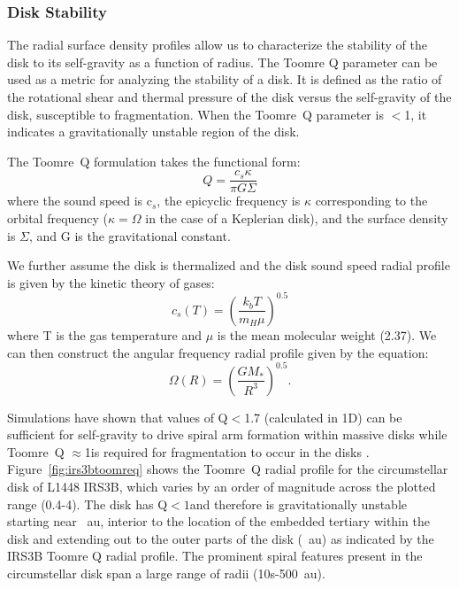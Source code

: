 \documentclass[twocolumn, 12pt, trackchanges]{aastex63}
\begin{document}
\subsubsection{Disk Stability}\label{sec:stability}
The radial surface density profiles allow us to characterize the stability of the disk to its self-gravity as a function of radius. The Toomre Q parameter can be used as a metric for analyzing the stability of a disk. It is defined as the ratio of the rotational shear and thermal pressure of the disk versus the self-gravity of the disk, susceptible to fragmentation. When the Toomre~Q parameter is $<$1, it indicates a gravitationally unstable region of the disk. 

The Toomre~Q formulation takes the functional form: 
\begin{equation}
Q = \frac{c_{s} \kappa}{\pi G \Sigma}
\end{equation}
where the sound speed is c$_s$, the epicyclic frequency is $\kappa$ corresponding to the orbital frequency ($\kappa = \Omega$ in the case of a Keplerian disk), and the surface density is $\Sigma$, and G is the gravitational constant.

We further assume the disk is thermalized and the disk sound speed radial profile is given by the kinetic theory of gases: 
\begin{equation}\label{eq:cs}
c_{s}\left(T\right) = \left(\frac{k_{b}T}{m_{H} \mu}\right) ^{0.5}
\end{equation}
where T is the gas temperature and $\mu$ is the mean molecular weight (2.37). We can then construct the angular frequency radial profile given by the equation:
\begin{equation}
\Omega\left(R\right) = \left(\frac{GM_{*}}{R^{3}}\right)^{0.5}.
\end{equation}
 
Simulations have shown that values of Q$<$1.7 (calculated in 1D) can be sufficient for self-gravity to drive spiral arm formation within massive disks while Toomre~Q $\approx$1\space is required for fragmentation to occur in the disks \citep[][]{2010ApJ...710.1375K}. Figure~\ref{fig:irs3btoomreq} shows the Toomre~Q radial profile for the circumstellar disk of L1448 IRS3B, which varies by an order of magnitude across the plotted range (0.4-4). The disk has Q$<1$\space and therefore is  gravitationally unstable starting near ~au, interior to the location of the embedded tertiary within the disk and extending out to the outer parts of the disk (~au) as indicated by the  IRS3B Toomre Q radial profile. The prominent spiral features present in the circumstellar disk span a large range of radii (10s-500~au).
\end{document}
